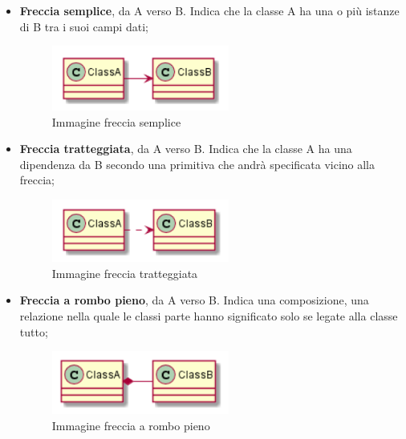 \begin{itemize}
    \item \textbf{Freccia semplice}, da A verso B. Indica che la classe A ha una o più istanze di B tra i suoi campi dati;
    \begin{figure}[H]
    	\begin{center}
	    	\includegraphics[width=0.55\textwidth]{../includes/pics/frecciasemplice.png}
	    	\caption{Immagine freccia semplice}
	    \end{center}
    \end{figure}
    \item \textbf{Freccia tratteggiata}, da A verso B. Indica che la classe A ha una dipendenza da B secondo una primitiva che andrà specificata vicino alla freccia;
    \begin{figure}[H]
    	\begin{center}
	    	\includegraphics[width=0.55\textwidth]{../includes/pics/frecciatratteggiata.png}
	    	\caption{Immagine freccia tratteggiata}
    	\end{center}
   	\end{figure}
    \item \textbf{Freccia a rombo pieno}, da A verso B. Indica una composizione, una relazione nella quale le classi parte hanno significato solo se legate alla classe tutto;
    \begin{figure}[H]
    	\begin{center}
	    	\includegraphics[width=0.55\textwidth]{../includes/pics/frecciarombopieno.png}
	    	\caption{Immagine freccia a rombo pieno}
    	\end{center}

\end{figure}
\end{itemize}

